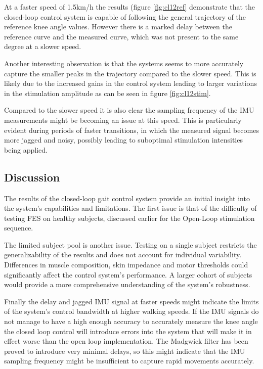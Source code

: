 
At a faster speed of 1.5km/h the results (figure \ref{fig:cl12ref} demonstrate that the closed-loop control system is capable of following the general trajectory of the reference knee angle values. However there is a marked delay between the reference curve and the measured curve, which was not present to the same degree at a slower speed.

Another interesting observation is that the systems seems to more accurately capture the smaller peaks in the trajectory compared to the slower speed. This is likely due to the increased gains in the control system leading to larger variations in the stimulation amplitude as can be seen in figure \ref{fig:cl12stim}.

Compared to the slower speed it is also clear the sampling frequency of the IMU measurements might be becoming an issue at this speed. This is particularly evident during periods of faster transitions, in which the measured signal becomes more jagged and noisy, possibly leading to suboptimal stimulation intensities being applied. 

\subsection{Discussion}
The results of the closed-loop gait control system provide an initial insight into the system's capabilities and limitations. The first issue is that of the difficulty of testing FES on healthy subjects, discussed earlier for the Open-Loop stimulation sequence.

The limited subject pool is another issue. Testing on a single subject restricts the generalizability of the results and does not account for individual variability. Differences in muscle composition, skin impedance and motor thresholds could significantly affect the control system's performance. A larger cohort of subjects would provide a more comprehensive understanding of the system's robustness.

Finally the delay and jagged IMU signal at faster speeds might indicate the limits of the system's control bandwidth at higher walking speeds. If the IMU signals do not manage to have a high enough accuracy to accurately measure the knee angle the closed loop control will introduce errors into the system that will make it in effect worse than the open loop implementation. The Madgwick filter has been proved to introduce very minimal delays, so this might indicate that the IMU sampling frequency might be insufficient to capture rapid movements accurately. 

